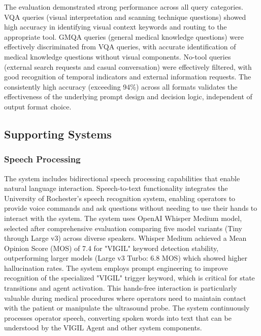 \documentclass[12pt,a4paper]{article}
\begin{document}
The evaluation demonstrated strong performance across all query categories. VQA queries (visual interpretation and scanning technique questions) showed high accuracy in identifying visual context keywords and routing to the appropriate tool. GMQA queries (general medical knowledge questions) were effectively discriminated from VQA queries, with accurate identification of medical knowledge questions without visual components. No-tool queries (external search requests and casual conversation) were effectively filtered, with good recognition of temporal indicators and external information requests. The consistently high accuracy (exceeding 94\%) across all formats validates the effectiveness of the underlying prompt design and decision logic, independent of output format choice.

\subsection{Supporting Systems}

\subsubsection{Speech Processing}

The system includes bidirectional speech processing capabilities that enable natural language interaction. Speech-to-text functionality integrates the University of Rochester's speech recognition system, enabling operators to provide voice commands and ask questions without needing to use their hands to interact with the system. The system uses OpenAI Whisper Medium model, selected after comprehensive evaluation comparing five model variants (Tiny through Large v3) across diverse speakers. Whisper Medium achieved a Mean Opinion Score (MOS) of 7.4 for "VIGIL" keyword detection stability, outperforming larger models (Large v3 Turbo: 6.8 MOS) which showed higher hallucination rates. The system employs prompt engineering to improve recognition of the specialized "VIGIL" trigger keyword, which is critical for state transitions and agent activation. This hands-free interaction is particularly valuable during medical procedures where operators need to maintain contact with the patient or manipulate the ultrasound probe. The system continuously processes operator speech, converting spoken words into text that can be understood by the VIGIL Agent and other system components.
\end{document}
